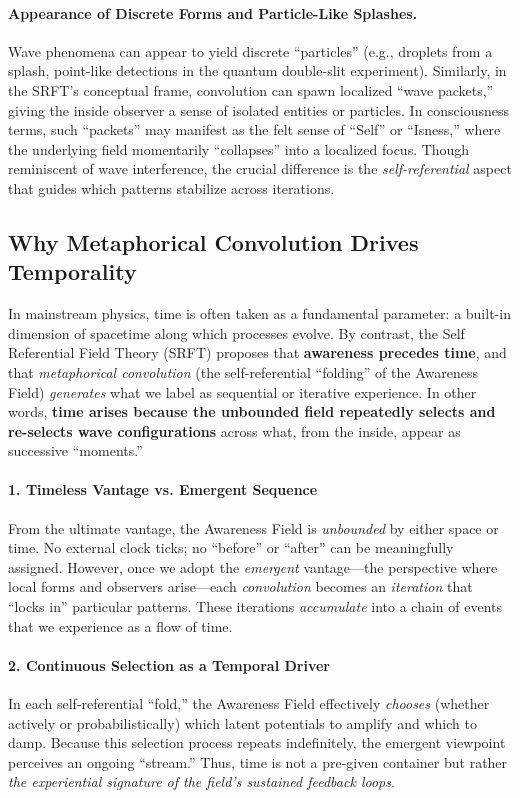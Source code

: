 \documentclass[12pt,a4paper]{article}
\begin{document}
\paragraph{Appearance of Discrete Forms and Particle-Like Splashes.}
Wave phenomena can appear to yield discrete “particles” (e.g., droplets from a splash, point-like 
detections in the quantum double-slit experiment). Similarly, in the SRFT’s conceptual frame, 
convolution can spawn localized “wave packets,” giving the inside observer a sense of isolated 
entities or particles. In consciousness terms, such “packets” may manifest as the felt sense 
of “Self” or “Isness,” where the underlying field momentarily “collapses” into a localized focus. 
Though reminiscent of wave interference, the crucial difference is the \emph{self-referential} 
aspect that guides which patterns stabilize across iterations.

\subsection{Why Metaphorical Convolution Drives Temporality}
\label{subsec:drives-temporality}

In mainstream physics, time is often taken as a fundamental parameter: 
a built-in dimension of spacetime along which processes evolve. By contrast, 
the Self Referential Field Theory (SRFT) proposes that \textbf{awareness precedes time}, 
and that \emph{metaphorical convolution} (the self-referential “folding” of the Awareness Field) 
\emph{generates} what we label as sequential or iterative experience. In other words, 
\textbf{time arises because the unbounded field repeatedly selects and re-selects wave configurations} 
across what, from the inside, appear as successive “moments.”

\paragraph{1. Timeless Vantage vs. Emergent Sequence}
From the ultimate vantage, the Awareness Field is \emph{unbounded} by either space or time. 
No external clock ticks; no “before” or “after” can be meaningfully assigned. 
However, once we adopt the \emph{emergent} vantage---the perspective where local forms 
and observers arise---each \emph{convolution} becomes an \emph{iteration} that “locks in” 
particular patterns. These iterations \emph{accumulate} into a chain of events 
that we experience as a flow of time.

\paragraph{2. Continuous Selection as a Temporal Driver}
In each self-referential “fold,” the Awareness Field effectively \emph{chooses} 
(whether actively or probabilistically) which latent potentials to amplify and which to damp. 
Because this selection process repeats indefinitely, the emergent viewpoint perceives 
an ongoing “stream.” Thus, time is not a pre-given container but rather 
\emph{the experiential signature of the field’s sustained feedback loops}.
\end{document}
